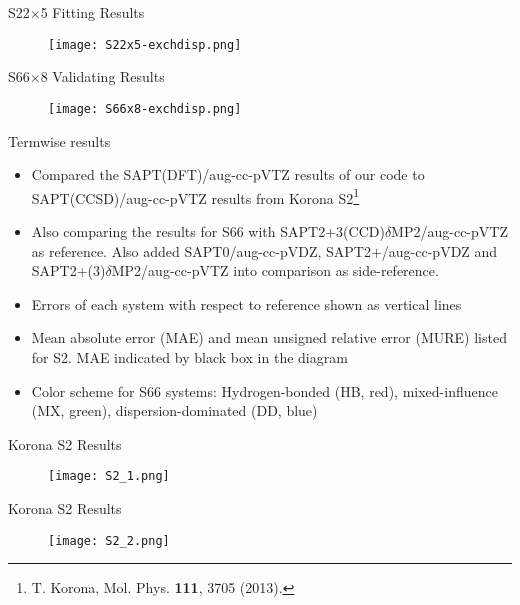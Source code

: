 \documentclass{beamer}
\begin{document}
        \begin{frame}{S22$\times$5 Fitting Results}
            \begin{figure}
                \centering
                \texttt{[image: S22x5-exchdisp.png]}
            \end{figure}   
        \end{frame}

        \begin{frame}{S66$\times$8 Validating Results}
            \begin{figure}
                \centering
                \texttt{[image: S66x8-exchdisp.png]}
            \end{figure}  
        \end{frame}

        \begin{frame}{Termwise results}
            \begin{itemize}
                \item Compared the SAPT(DFT)/aug-cc-pVTZ results of our code to SAPT(CCSD)/aug-cc-pVTZ results from Korona S2\footnote{T. Korona, Mol. Phys. \textbf{111}, 3705 (2013).}
                \item Also comparing the results for S66 with SAPT2+3(CCD)$\delta$MP2/aug-cc-pVTZ as reference. Also added SAPT0/aug-cc-pVDZ, SAPT2+/aug-cc-pVDZ and SAPT2+(3)$\delta$MP2/aug-cc-pVTZ into comparison as side-reference. 
                \item Errors of each system with respect to reference shown as vertical lines
                \item Mean absolute error (MAE) and mean unsigned relative error (MURE) listed for S2. MAE indicated by black box in the diagram
                \item Color scheme for S66 systems: Hydrogen-bonded (HB, red), mixed-influence (MX, green), dispersion-dominated (DD, blue)
            \end{itemize}
        \end{frame}

        \begin{frame}{Korona S2 Results}
            \begin{figure}
                \centering
                \texttt{[image: S2\_1.png]}
            \end{figure}  
        \end{frame}

        \begin{frame}{Korona S2 Results}
            \begin{figure}
                \centering
                \texttt{[image: S2\_2.png]}
            \end{figure}  
        \end{frame}
\end{document}
